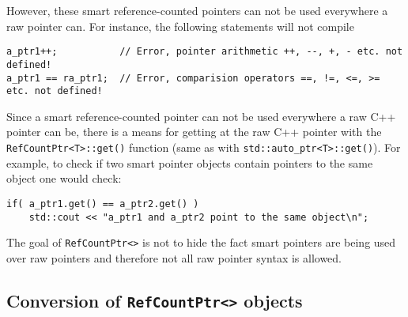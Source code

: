 However, these smart reference-counted pointers can not be used
everywhere a raw pointer can.  For instance, the following
statements will not compile

{\scriptsize\begin{verbatim}
a_ptr1++;           // Error, pointer arithmetic ++, --, +, - etc. not defined!
a_ptr1 == ra_ptr1;  // Error, comparision operators ==, !=, <=, >= etc. not defined!
\end{verbatim}}

Since a smart reference-counted pointer can not be used everywhere a
raw C++ pointer can be, there is a means for getting at the raw C++
pointer with the {}\texttt{RefCountPtr<T>::get()} function (same as with
{}\texttt{std::auto\_ptr<T>::get()}).  For example, to check if two
smart pointer objects contain pointers to the same object one would
check:

{\scriptsize\begin{verbatim}
if( a_ptr1.get() == a_ptr2.get() )
    std::cout << "a_ptr1 and a_ptr2 point to the same object\n";
\end{verbatim}}

The goal of {}\texttt{RefCountPtr<>} is not to hide the fact smart
pointers are being used over raw pointers and therefore not all raw
pointer syntax is allowed.

%
\subsection{Conversion of {}\texttt{RefCountPtr<>} objects}
%

